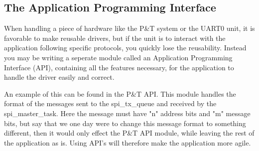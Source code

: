 \subsection{The Application Programming Interface}
\label{sec:TheApplicationProgrammerInterface}

When handling a piece of hardware like the P\&T system or the UART0 unit, it is favorable to make reusable drivers, but if the unit is to interact with the application following specific protocols, you quickly lose the reusability. 
Instead you may be writing a seperate module called an Application Programming Interface (API), containing all the features necessary, for the application to handle the driver easily and correct.

An example of this can be found in the P\&T API. This module handles the format of the messages sent to the spi\_tx\_queue and received by the spi\_master\_task. Here the message must have "n" address bits and "m" message bits, but say that we one day were to change this message format to something different, then it would only effect the P\&T API module, while leaving the rest of the application as is. Using API's will therefore make the application more agile. 

